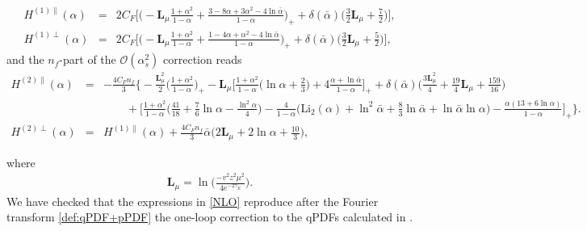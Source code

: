 \documentclass[aps,prd,twocolumn,a4paper,superscriptaddress,10pt,showpacs,notitlepage,floatfix]{revtex4-1}
\begin{document}
\begin{widetext}
\begin{eqnarray}
\label{NLO}
H^{(1)\parallel}(\alpha)&=&2C_F\Bigg[
\bigg(-\mathbf{L}_\mu \frac{1+\alpha^2}{1-\alpha}+\frac{3-8\alpha+3\alpha^2-4\ln\bar \alpha}{1-\alpha}\bigg)_+
+\delta(\bar \alpha)\bigg(\frac{3}{2}\mathbf{L}_\mu+\frac{7}{2}\bigg)\Bigg],
\\
H^{(1)\perp}(\alpha)&=&2C_F\Bigg[
 \bigg(-\mathbf{L}_\mu \frac{1+\alpha^2}{1-\alpha}+\frac{1-4\alpha+\alpha^2-4\ln\bar \alpha}{1-\alpha}\bigg)_+
 +\delta(\bar \alpha)\bigg(\frac{3}{2}\mathbf{L}_\mu+\frac{5}{2}\bigg)\Bigg],
\end{eqnarray}
and the $n_f$-part of the $\mathcal{O}(\alpha_s^2)$ correction reads 
\begin{eqnarray}
\label{NNLO}
H^{(2)\parallel}(\alpha)&=&
-\frac{4C_Fn_f}{3}\biggl\{-\frac{\mathbf{L}_\mu^2}{2}\Big(\frac{1+\alpha^2}{1-\alpha}\Big)_+-\mathbf{L}_\mu \Big[\frac{1+\alpha^2}{1-\alpha}\Big(\ln\alpha+\frac{2}{3}\Big)+4\frac{\alpha+\ln\bar \alpha}{1-\alpha}\Big]_+
+\delta(\bar \alpha)\Big(\frac{3\mathbf{L}_\mu^2}{4}+\frac{19}{4}\mathbf{L}_\mu+\frac{159}{16}\Big)
\\\nonumber && \qquad+\Big[\frac{1+\alpha^2}{1-\alpha}\Big(\frac{41}{18}+\frac{7}{6}\ln\alpha-\frac{\ln^2\alpha}{4}\Big)
-\frac{4}{1-\alpha}\Big(\text{Li}_2(\alpha)+\ln^2\bar \alpha+\frac{8}{3}\ln\bar \alpha+\ln \bar \alpha \ln\alpha\Big)
-\frac{\alpha(13+6\ln \alpha)}{1-\alpha}\Big]_+ \biggr\}.
\\
H^{(2)\perp}(\alpha)&=&H^{(1)\parallel}(\alpha)+\frac{4C_Fn_f}{3}\bar \alpha\Big(2\mathbf{L}_\mu+2\ln\alpha+\frac{10}{3}\Big),
\end{eqnarray}
\end{widetext}
where
\begin{eqnarray}
\mathbf{L}_\mu=\ln\bigg(\frac{-v^2z^2\mu^2}{4e^{-2\gamma_E}}\bigg).
\end{eqnarray}
We have checked that the expressions in \eqref{NLO} reproduce after the Fourier transform \eqref{def:qPDF+pPDF}
the one-loop correction to the qPDFs calculated in \cite{Xiong:2013bka,Stewart:2017tvs}. 

%
\end{document}
